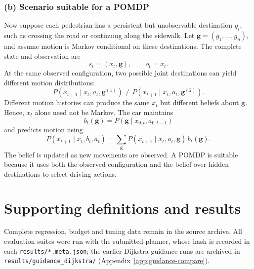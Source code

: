 \documentclass[11pt,a4paper]{article}
\begin{document}
\subsubsection*{(b) Scenario suitable for a POMDP}

Now suppose each pedestrian has a persistent but unobservable destination
$g_i$, such as crossing the road or continuing along the sidewalk.
Let $\mathbf g=(g_1,\ldots,g_n)$, and assume motion is Markov conditional
on these destinations. The complete state and observation are
\[
s_t=(x_t,\mathbf g),\qquad o_t=x_t.
\]
At the same observed configuration, two possible joint destinations
can yield different motion distributions:
\[
P(x_{t+1}\mid x_t,a_t,\mathbf g^{(1)})
\neq
P(x_{t+1}\mid x_t,a_t,\mathbf g^{(2)}).
\]
Different motion histories can produce the same $x_t$ but different
beliefs about $\mathbf g$. Hence, $x_t$ alone need not be Markov.
The car maintains
\[
b_t(\mathbf g)=P(\mathbf g\mid x_{0:t},a_{0:t-1})
\]
and predicts motion using
\[
P(x_{t+1}\mid x_t,b_t,a_t)
=\sum_{\mathbf g}
P(x_{t+1}\mid x_t,a_t,\mathbf g)\,b_t(\mathbf g).
\]
The belief is updated as new movements are observed. A POMDP is suitable
because it uses both the observed configuration and the belief over hidden
destinations to select driving actions.
\par
\endgroup

\clearpage


\par\bigskip
\begingroup
\setlength{\parindent}{0pt}
\setlength{\parskip}{4pt}
\setlength{\tabcolsep}{4.5pt}
\renewcommand{\arraystretch}{1.13}
\appendix
\section{Supporting definitions and results}
\label{app:details}
Complete regression, budget and tuning data remain in the source archive.
All evaluation suites were run with the submitted planner, whose hash is
recorded in each \texttt{results/*.meta.json}; the earlier Dijkstra-guidance
runs are archived in \texttt{results/\allowbreak guidance\_dijkstra/}
(Appendix~\ref{app:guidance-compare}).


\clearpage

\endgroup
\end{document}
